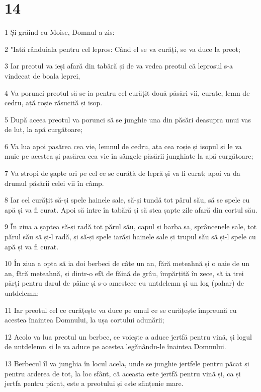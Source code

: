 \chapter{14}

\par 1 Și grăind cu Moise, Domnul a zis:
\par 2 "Iată rânduiala pentru cel lepros: Când el se va curăți, se va duce la preot;
\par 3 Iar preotul va ieși afară din tabără și de va vedea preotul că leprosul s-a vindecat de boala leprei,
\par 4 Va porunci preotul să se ia pentru cel curățit două păsări vii, curate, lemn de cedru, ață roșie răsucită și isop.
\par 5 După aceea preotul va porunci să se junghie una din păsări deasupra unui vas de lut, la apă curgătoare;
\par 6 Va lua apoi pasărea cea vie, lemnul de cedru, ața cea roșie și isopul și le va muie pe acestea și pasărea cea vie în sângele păsării junghiate la apă curgătoare;
\par 7 Va stropi de șapte ori pe cel ce se curăță de lepră și va fi curat; apoi va da drumul păsării celei vii în câmp.
\par 8 Iar cel curățit să-și spele hainele sale, să-și tundă tot părul său, să se spele cu apă și va fi curat. Apoi să intre în tabără și să stea șapte zile afară din cortul său.
\par 9 În ziua a șaptea să-și radă tot părul său, capul și barba sa, sprâncenele sale, tot părul său să și-l radă, și să-și spele iarăși hainele sale și trupul său să și-l spele cu apă și va fi curat.
\par 10 În ziua a opta să ia doi berbeci de câte un an, fără meteahnă și o oaie de un an, fără meteahnă, și dintr-o efă de făină de grâu, împărțită în zece, să ia trei părți pentru darul de pâine și s-o amestece cu untdelemn și un log (pahar) de untdelemn;
\par 11 Iar preotul cel ce curățește va duce pe omul ce se curățește împreună cu acestea înaintea Domnului, la ușa cortului adunării;
\par 12 Acolo va lua preotul un berbec, ce voiește a aduce jertfă pentru vină, și logul de untdelemn și le va aduce pe acestea legănându-le înaintea Domnului.
\par 13 Berbecul îl va junghia în locul acela, unde se junghie jertfele pentru păcat și pentru arderea de tot, la loc sfânt, că aceasta este jertfă pentru vină și, ca și jertfa pentru păcat, este a preotului și este sfințenie mare.
